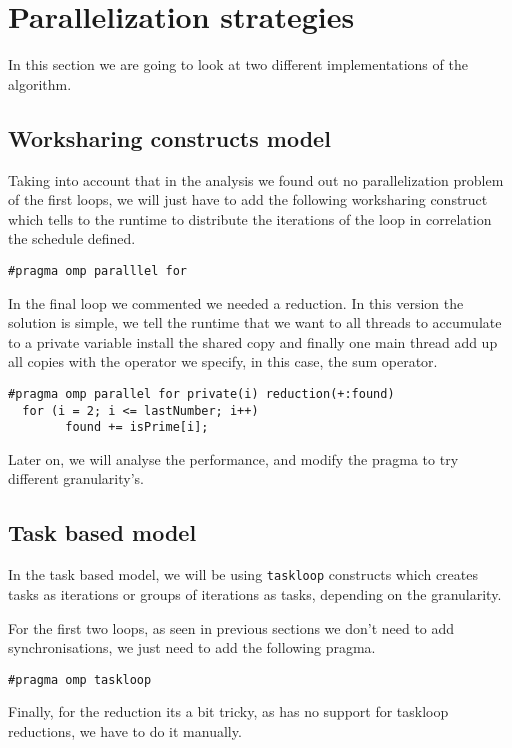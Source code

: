 \section{Parallelization strategies}
In this section we are going to look at two different implementations of the \sieve algorithm. 

\subsection{Worksharing constructs model}
Taking into account that in the analysis we found out no parallelization problem of the first loops, we will just have to add the following worksharing construct which tells to the \omp runtime to distribute the iterations of the loop in correlation the schedule defined.
\begin{lstlisting}[caption={Base pragma for worksharing constructs}, captionpos=b]
#pragma omp paralllel for
\end{lstlisting}

In the final loop we commented we needed a reduction. In this version the solution is simple, we tell the \omp runtime that we want to all threads to accumulate to a private variable install the shared copy and finally one main thread add up all copies with the operator we specify, in this case, the sum operator.

\begin{lstlisting}[caption={Base pragma plus a reduction}, captionpos=b]
  #pragma omp parallel for private(i) reduction(+:found) 
  for (i = 2; i <= lastNumber; i++)
        found += isPrime[i];
\end{lstlisting}

\justify
Later on, we will analyse the performance, and modify the pragma to try different granularity's.

\subsection{Task based model}
In the task based model, we will be using \texttt{taskloop} constructs which creates tasks as iterations or groups of iterations as tasks, depending on the granularity.

\justify
For the first two loops, as seen in previous sections we don't need to add synchronisations, we just need to add the following pragma.

\begin{lstlisting}[caption={Base pragma for task based model}, captionpos=b]
  #pragma omp taskloop
\end{lstlisting}
\justify
Finally, for the reduction its a bit tricky, as \omp has no support for taskloop reductions, we have to do it manually.  

